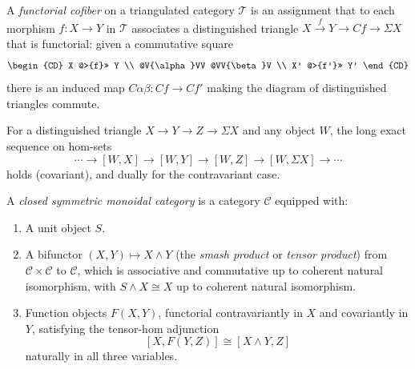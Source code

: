 \begin{definition}\label{prereq:def:functorial-cofiber}
    \leanok
    A \emph{functorial cofiber} on a triangulated category $\mathcal{T}$ is an assignment that to each morphism $f: X \to Y$ in $\mathcal{T}$ associates a distinguished triangle $X \xrightarrow{f} Y \to Cf \to \Sigma X$ that is functorial: given a commutative square
    $$\begin{CD}
    X @>{f}>> Y \\
    @V{\alpha}VV @VV{\beta}V \\
    X' @>{f'}>> Y'
    \end{CD}$$
    there is an induced map $C\alpha\beta: Cf \to Cf'$ making the diagram of distinguished triangles commute.
\end{definition}

\begin{proposition}\label{prereq:prop:les-hom}
    \leanok
    For a distinguished triangle $X \to Y \to Z \to \Sigma X$ and any object $W$, the long exact sequence on hom-sets
    $$\cdots \to [W, X] \to [W, Y] \to [W, Z] \to [W, \Sigma X] \to \cdots$$
    holds (covariant), and dually for the contravariant case.
\end{proposition}

\begin{definition}\label{prereq:def:closed-symmetric-monoidal}
    \leanok
    A \emph{closed symmetric monoidal category} is a category $\mathcal{C}$ equipped with:
    \begin{enumerate}
        \item A unit object $S$.
        \item A bifunctor $(X, Y) \mapsto X \wedge Y$ (the \emph{smash product} or \emph{tensor product}) from $\mathcal{C} \times \mathcal{C}$ to $\mathcal{C}$, which is associative and commutative up to coherent natural isomorphism, with $S \wedge X \cong X$ up to coherent natural isomorphism.
        \item Function objects $F(X, Y)$, functorial contravariantly in $X$ and covariantly in $Y$, satisfying the tensor-hom adjunction
        $$[X, F(Y, Z)] \cong [X \wedge Y, Z]$$
        naturally in all three variables.
    \end{enumerate}
\end{definition}

